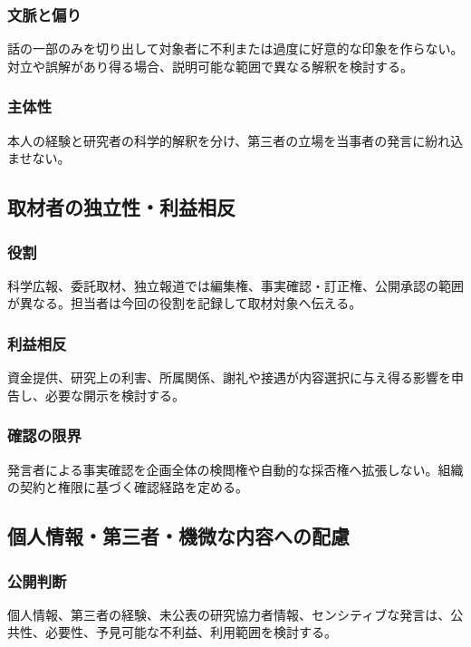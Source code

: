 \documentclass[a4paper,11pt]{article}
\begin{document}
\subsubsection{文脈と偏り}
\par 話の一部のみを切り出して対象者に不利または過度に好意的な印象を作らない。対立や誤解があり得る場合、説明可能な範囲で異なる解釈を検討する。\par\medskip
\subsubsection{主体性}
\par 本人の経験と研究者の科学的解釈を分け、第三者の立場を当事者の発言に紛れ込ませない。\par\medskip
\subsection{取材者の独立性・利益相反}
\subsubsection{役割}
\par 科学広報、委託取材、独立報道では編集権、事実確認・訂正権、公開承認の範囲が異なる。担当者は今回の役割を記録して取材対象へ伝える。\par\medskip
\subsubsection{利益相反}
\par 資金提供、研究上の利害、所属関係、謝礼や接遇が内容選択に与え得る影響を申告し、必要な開示を検討する。\par\medskip
\subsubsection{確認の限界}
\par 発言者による事実確認を企画全体の検閲権や自動的な採否権へ拡張しない。組織の契約と権限に基づく確認経路を定める。\par\medskip
\subsection{個人情報・第三者・機微な内容への配慮}
\subsubsection{公開判断}
\par 個人情報、第三者の経験、未公表の研究協力者情報、センシティブな発言は、公共性、必要性、予見可能な不利益、利用範囲を検討する。\par\medskip
\end{document}
